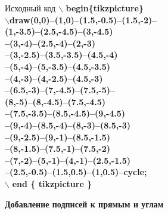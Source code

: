 \documentclass{beamer}
\begin{document}
\begin{frame}{Исходный код}
$\backslash$ \textbf{begin\{tikzpicture\} }\\
$\backslash$\textbf{draw(0,0)--(1,0)--(1.5,-0.5)--(1.5,-2)--}\\
\textbf{(1,-3.5)--(2.5,-4.5)--(3,-4.5)}\\
\textbf{--(3,-4)--(2.5,-4)--(2,-3)}\\
\textbf{--(3,-2.5)--(3.5,-3.5)--(4.5,-4)}\\
\textbf{--(5,-4)--(5,-3.5)--(4.5,-3.5)}\\
\textbf{--(4,-3)--(4,-2.5)--(4.5,-3)}\\
\textbf{--(6.5,-3)--(7,-4.5)--(7.5,-5)--}\\
\textbf{(8,-5)--(8,-4.5)--(7.5,-4.5)}\\
\textbf{--(7.5,-3.5)--(8.5,-4.5)--(9,-4.5)}\\
\textbf{--(9,-4)--(8.5,-4)--(8,-3)--(8.5,-3)}\\
\textbf{--(9,-2.5)--(9,-1)--(8.5,-1.5)}\\
\textbf{--(8,-1.5)--(7.5,-1)--(7.5,-2)}\\
\textbf{--(7,-2)--(5,-1)--(4,-1)--(2.5,-1.5)}\\
\textbf{--(2.5,-0.5)--(1.5,0.5)--(1,0.5)--cycle;}\\
$\backslash$\textbf{ end \{ tikzpicture \}}\\
\end{frame}

\begin{frame}

\textbf{Добавление подписей к прямым и углам}\



\end{frame}
\end{document}
